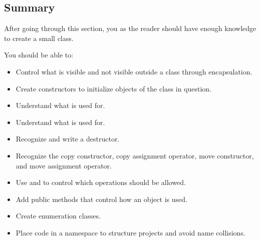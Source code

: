 \subsection{Summary}
\label{c2:sec:classes1summary}
After going through this section, you as the reader should have enough knowledge to create a small
class.

You should be able to:
\begin{itemize}
  \item Control what is visible and not visible outside a class through encapsulation.
  \item Create constructors to initialize objects of the class in question.
  \item Understand what  is used for.
  \item Understand what  is used for.
  \item Recognize and write a destructor.
  \item Recognize the copy constructor, copy assignment operator, move constructor, and move
    assignment operator.
  \item Use  and  to control which operations should be allowed.
  \item Add public methods that control how an object is used.
  \item Create enumeration classes.
  \item Place code in a namespace to structure projects and avoid name collisions.
\end{itemize}
